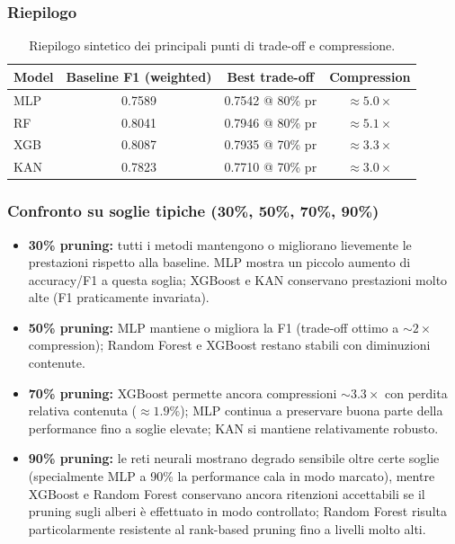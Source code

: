 \documentclass[a4paper,12pt]{report}
\begin{document}
	\subsubsection{Riepilogo}
	\begin{table}[H]
		\centering
		\begin{tabular}{lccc}
			\toprule
			\textbf{Model} & \textbf{Baseline F1 (weighted)} & \textbf{Best trade-off} & \textbf{Compression} \\
			\midrule
			MLP      & 0.7589 & 0.7542 @ 80\% pr & \(\approx 5.0\times\) \\
			RF       & 0.8041 & 0.7946 @ 80\% pr & \(\approx 5.1\times\) \\
			XGB      & 0.8087 & 0.7935 @ 70\% pr & \(\approx 3.3\times\) \\
			KAN      & 0.7823 & 0.7710 @ 70\% pr & \(\approx 3.0\times\) \\
			\bottomrule
		\end{tabular}
		\caption{Riepilogo sintetico dei principali punti di trade-off e compressione.}
	\end{table}
	
	\subsubsection{Confronto su soglie tipiche (30\%, 50\%, 70\%, 90\%)}
	\begin{itemize}
		\item \textbf{30\% pruning:} tutti i metodi mantengono o migliorano lievemente le prestazioni rispetto alla baseline. MLP mostra un piccolo aumento di accuracy/F1 a questa soglia; XGBoost e KAN conservano prestazioni molto alte (F1 praticamente invariata).
		\item \textbf{50\% pruning:} MLP mantiene o migliora la F1 (trade-off ottimo a \(\sim 2\times\) compression); Random Forest e XGBoost restano stabili con diminuzioni contenute.
		\item \textbf{70\% pruning:} XGBoost permette ancora compressioni \(\sim 3.3\times\) con perdita relativa contenuta (\(\approx 1.9\%\)); MLP continua a preservare buona parte della performance fino a soglie elevate; KAN si mantiene relativamente robusto.
		\item \textbf{90\% pruning:} le reti neurali mostrano degrado sensibile oltre certe soglie (specialmente MLP a 90\% la performance cala in modo marcato), mentre XGBoost e Random Forest conservano ancora ritenzioni accettabili se il pruning sugli alberi è effettuato in modo controllato; Random Forest risulta particolarmente resistente al rank-based pruning fino a livelli molto alti.
	\end{itemize}
	
\end{document}
